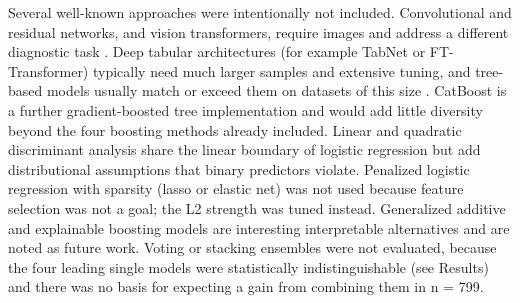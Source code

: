 \documentclass[a4paper,fleqn]{cas-dc}
\begin{document}
Several well-known approaches were intentionally not included. Convolutional and residual networks, and vision transformers, require images and address a different diagnostic task \cite{r11,r12}. Deep tabular architectures (for example TabNet or FT-Transformer) typically need much larger samples and extensive tuning, and tree-based models usually match or exceed them on datasets of this size \cite{r25}. CatBoost is a further gradient-boosted tree implementation and would add little diversity beyond the four boosting methods already included. Linear and quadratic discriminant analysis share the linear boundary of logistic regression but add distributional assumptions that binary predictors violate. Penalized logistic regression with sparsity (lasso or elastic net) was not used because feature selection was not a goal; the L2 strength was tuned instead. Generalized additive and explainable boosting models are interesting interpretable alternatives and are noted as future work. Voting or stacking ensembles were not evaluated, because the four leading single models were statistically indistinguishable (see Results) and there was no basis for expecting a gain from combining them in n = 799.
\end{document}
